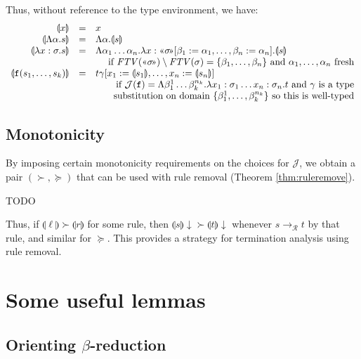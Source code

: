 \documentclass[runningheads,a4paper]{llncs}
\newcommand{\Rules}{\mathcal{R}}
\newcommand{\Termmap}{\mathcal{J}}
\newcommand{\typeinterpret}[1]{\text{\guillemotleft} #1\! \text{\guillemotright}}
\newcommand{\interpret}[1]{\llparenthesis #1 \rrparenthesis}
\newcommand{\arr}[1]{\to_{#1}}
\newcommand{\abs}[2]{\lambda #1.#2}
\newcommand{\tabs}[2]{\Lambda #1.#2}
\newcommand{\FTV}{\mathit{FTV}}
\begin{document}
Thus, without reference to the type environment, we have:
\[
\begin{array}{rcl}
\interpret{x} & = & x \\
\interpret{\tabs{\alpha}{s}} & = & \tabs{\alpha}{\interpret{s}} \\
\interpret{\abs{x:\sigma}{s}} & = & \tabs{\alpha_1 \dots \alpha_n}{
  \abs{x:\typeinterpret{\sigma}[\beta_1:=\alpha_1,\dots,\beta_n:=
  \alpha_n]}{\interpret{s}}} \\
  & & \ \ \ \ \hfill
  \text{if}\ \FTV(\typeinterpret{\sigma}) \setminus \FTV(\sigma) =
  \{ \beta_1,\dots,\beta_n \}\ \text{and}\ \alpha_1,\dots,\alpha_n\ 
  \text{fresh} \\
\interpret{\mathtt{f}(s_1,\dots,s_k)} & = &
  t\gamma[x_1:=\interpret{s_1},\dots,x_n:=\interpret{s_n}] \\
  & & \ \ \ \ \hfill \text{if}\ 
  \Termmap(\mathtt{f}) = \tabs{\beta_1^1 \dots \beta_k^{
  n_k}}{\abs{x_1:\sigma_1 \dots x_n:\sigma_n}{t}}\ \text{and}\ \gamma\ 
  \text{is a type} \\
  & & \ \ \ \ \hfill \text{substitution
  on domain}\ \{ \beta_1^1,\dots,\beta_k^{n_k} \}\ \text{so this is
  well-typed} \\
\end{array}
\]

\subsection{Monotonicity}

By imposing certain monotonicity requirements on the choices for
$\Termmap$, we obtain a pair $(\succ,\succeq)$ that can be used with
rule removal (Theorem \ref{thm:ruleremove}).

\begin{lemma}
TODO
\end{lemma}

Thus, if $\interpret{\ell} \succ \interpret{r}$ for some rule, then
$\interpret{s}\downarrow \succ \interpret{t}\downarrow$ whenever
$s \arr{\Rules} t$ by that rule, and similar for $\succeq$.  This
provides a strategy for termination analysis using rule removal.

\section{Some useful lemmas}

\subsection{Orienting $\beta$-reduction}
\end{document}
